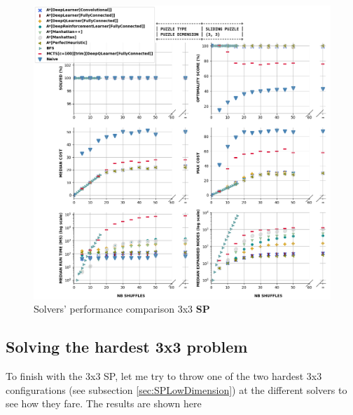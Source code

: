\begin{figure}[H]
\centering
\includegraphics[scale=0.65]{./Figures/33SPPerformance}
\caption[33SPPerformance]{Solvers' performance comparison 3x3 \textbf{SP}}
\label{fig:33SPPerformance}
\end{figure}


\subsection{Solving the hardest 3x3 problem}
\label{ssec:33SPHard}
To finish with the 3x3 SP, let me try to throw one of the two hardest 3x3 configurations (see subsection \ref{sec:SPLowDimension}) at the different solvers to see how they fare. The results are shown here

